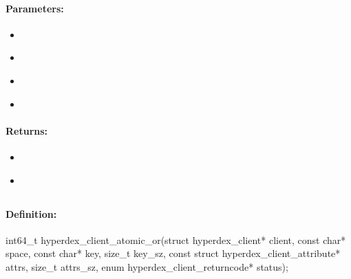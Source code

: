 \paragraph{Parameters:}
\begin{itemize}[noitemsep]
\item {}\\

\item {}\\

\item {}\\

\item {}\\

\end{itemize}

\paragraph{Returns:}
\begin{itemize}[noitemsep]
\item {}\\

\item {}\\

\end{itemize}

\pagebreak
\subsection{}
\label{api:c:atomic_or}


\paragraph{Definition:}
\begin{ccode}
int64_t hyperdex_client_atomic_or(struct hyperdex_client* client,
        const char* space,
        const char* key, size_t key_sz,
        const struct hyperdex_client_attribute* attrs, size_t attrs_sz,
        enum hyperdex_client_returncode* status);
\end{ccode}

